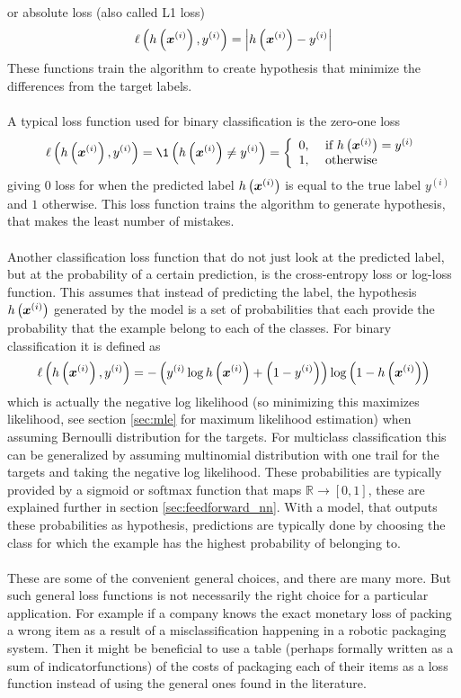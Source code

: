 or absolute loss (also called L1 loss)
$$ \ell\left(h\left (\boldsymbol{x}^{(i)}\right), y^{(i)}\right) = \left |h\left (\boldsymbol{x}^{(i)}\right) - y^{(i)}\right|$$
These functions train the algorithm to create hypothesis that minimize the differences from the target labels.
\\
\\
A typical loss function used for binary classification is the zero-one loss 
$$ \ell\left(h\lr{\boldsymbol{x}^{(i)}}, y^{(i)}\right)=\1\left(h\lr{\boldsymbol{x}^{(i)}} \neq y^{(i)} \right)=\left\{\begin{array}{ll}
0, & \text { if } h\lr{\boldsymbol{x}^{(i)}}=y^{(i)} \\
1, & \text { otherwise }
\end{array}\right. $$
giving $0$ loss for when the predicted label $h\left (\boldsymbol{x}^{(i)}\right)$ is equal to the true label $y^{(i)}$ and $1$ otherwise. This loss function trains the algorithm to generate hypothesis, that makes the least number of mistakes. 
\\
\\
Another classification loss function that do not just look at the predicted label, but at the probability of a certain prediction, is the cross-entropy loss or log-loss function. This assumes that instead of predicting the label, the hypothesis $h\left (\boldsymbol{x}^{(i)}\right)$ generated by the model is a set of probabilities that each provide the probability that the example belong to each of the classes. For binary classification it is defined as
\begin{equation}\label{eq:cross_entr}
    \ell\left(h\left (\boldsymbol{x}^{(i)}\right), y^{(i)} \right) = - \left (y^{(i)} \log h\left (\boldsymbol{x}^{(i)}\right) + \left (1 - y^{(i)}\right)\right) \log \left (1 - h\left (\boldsymbol{x}^{(i)}\right)\right)
\end{equation}
which is actually the negative log likelihood (so minimizing this maximizes likelihood, see section \ref{sec:mle} for maximum likelihood estimation) when assuming Bernoulli distribution for the targets. For multiclass classification this can be generalized by assuming multinomial distribution with one trail for the targets and taking the negative log likelihood. These probabilities are typically provided by a sigmoid or softmax function that maps $\mathbb{R} \rightarrow [0,1]$, these are explained further in section \ref{sec:feedforward_nn}. With a model, that outputs these probabilities as hypothesis, predictions are typically done by choosing the class for which the example has the highest probability of belonging to.
\\
\\
These are some of the convenient general choices, and there are many more. But such general loss functions is not necessarily the right choice for a particular application. For example if a company knows the exact monetary loss of packing a wrong item as a result of a misclassification happening in a robotic packaging system. Then it might be beneficial to use a table (perhaps formally written as a sum of indicatorfunctions) of the costs of packaging each of their items as a loss function instead of using the general ones found in the literature.



